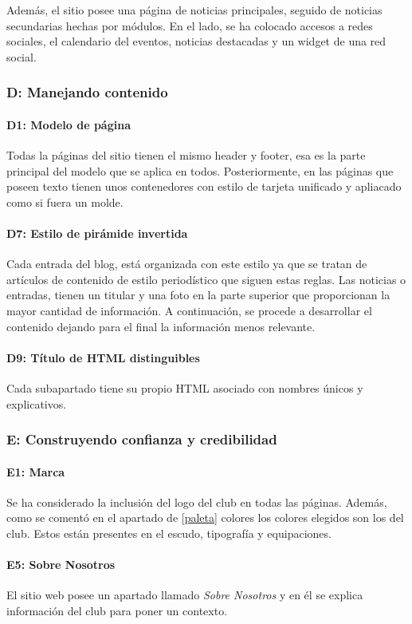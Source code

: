 \documentclass[10pt, spanish, pdftex]{template/UC3M_document}
\begin{document}
  Además, el sitio posee una página de noticias principales, seguido de noticias secundarias hechas por módulos. En el lado, se ha colocado accesos a redes sociales, el calendario del eventos, noticias destacadas y un widget de una red social.


\subsubsection{D: Manejando contenido}
\paragraph{D1: Modelo de página}
  Todas la páginas del sitio tienen el mismo header y footer, esa es la parte principal del modelo que se aplica en todos. Posteriormente, en las páginas que poseen texto tienen unos contenedores con estilo de tarjeta unificado y apliacado como si fuera un molde.
\paragraph{D7: Estilo de pirámide invertida}
  Cada entrada del blog, está organizada con este estilo ya que se tratan de artículos de contenido de estilo periodístico que siguen estas reglas. Las noticias o entradas, tienen un titular y una foto en la parte superior que proporcionan la mayor cantidad de información. A continuación, se procede a desarrollar el contenido dejando para el final la información menos relevante.
\paragraph{D9: Título de HTML distinguibles}
  Cada subapartado tiene su propio HTML asociado con nombres únicos y explicativos.


\subsubsection{E: Construyendo confianza y credibilidad}
\paragraph{E1: Marca}
  Se ha considerado la inclusión del logo del club en todas las páginas. Además, como se comentó en el apartado de \ref{paleta} colores los colores elegidos son los del club. Estos están presentes en el escudo, tipografía y equipaciones.
\paragraph{E5: Sobre Nosotros}
  El sitio web posee un apartado llamado \textit{Sobre Nosotros} y en él se explica información del club para poner un contexto.
\end{document}
